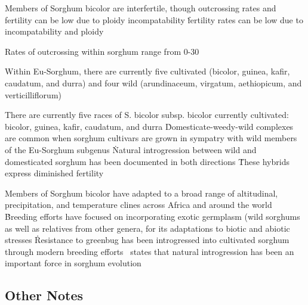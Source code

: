 \documentclass[11pt]{article}
\begin{document}
{{Members of Sorghum bicolor are interfertile, though outcrossing rates and fertility can be low due to ploidy incompatability \cite{doggett1988sorghum, arriola1996crop}\.

fertility rates can be low due to incompatability and ploidy 

Rates of outcrossing within sorghum range from 0-30%

Within Eu-Sorghum, there are currently five cultivated (bicolor, guinea, kafir, caudatum, and durra) and four wild (arundinaceum, virgatum, aethiopicum, and verticilliflorum)

There are currently five races of S. bicolor subsp. bicolor currently cultivated: bicolor, guinea, kafir, caudatum, and durra \cite{smith2000sorghum}\.
Domesticate-weedy-wild complexes are common when sorghum cultivars are grown in sympatry with wild members of the Eu-Sorghum subgenus \cite{de1978systematics, doggett1968disruptive, baker1972human}\.
Natural introgression between wild and domesticated sorghum has been documented in both directions \cite{kuhlman2006interspecific, aldrich1992restriction, aldrich1992patterns, doggett1988sorghum, baker1972migrations}\.
These hybrids express diminished fertility

Members of Sorghum bicolor have adapted to a broad range of altitudinal, precipitation, and temperature clines across Africa and around the world \cite{po1982sorghum}\.

Breeding efforts have focused on incorporating exotic germplasm (wild sorghums as well as relatives from other genera, \cite{de1976cytogenetics}\) for its adaptations to biotic and abiotic stresses \cite{reddy2006current, po1982sorghum, johnson1979breeding}\.
Resistance to greenbug has been introgressed into cultivated sorghum through modern breeding efforts \cite{johnson1979breeding}\.
\cite{po1982sorghum}\ states that natural introgression has been an important force in sorghum evolution

\subsection*{Other Notes}

}}
\end{document}
